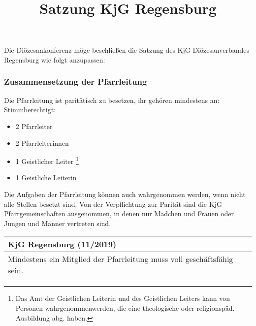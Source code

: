 \documentclass[12pt]{report}
\title{Satzung KjG Regensburg}
\author{}
\newcommand{\footnoteremember}[2]{
  \footnote{#2}
  \newcounter{#1}
  \setcounter{#1}{\value{footnote}}
}
\newcommand{\footnoterecall}[1]{%
  \footnotemark[\value{#1}]
}
\newcounter{tablecounter}
\newcommand\showcounter{\addtocounter{tablecounter}{1}\thetablecounter}
\begin{document}
\begin{flushleft}


Die Diözesankonferenz möge beschließen die Satzung des KjG Diözesanverbandes Regensburg wie folgt anzupassen:


\subsubsection{Zusammensetzung der Pfarrleitung}

Die Pfarrleitung ist paritätisch zu besetzen, ihr gehören mindestens an:
Stimmberechtigt:
\begin{itemize}
  \item 2 Pfarrleiter
  \item 2 Pfarrleiterinnen
  \item 1 Geistlicher Leiter \footnoteremember{Berechtigung Geist}{
    Das Amt der Geistlichen Leiterin und des Geistlichen Leiters kann von Personen wahrgenommenwerden,
    die eine theologische oder religionspäd. Ausbildung abg. haben.
  }
  \item 1 Geistliche Leiterin \footnoterecall{Berechtigung Geist}
\end{itemize}
Die Aufgaben der Pfarrleitung können auch wahrgenommen werden, wenn nicht alle Stellen besetzt sind.
Von der Verpflichtung zur Parität sind die KjG Pfarrgemeinschaften ausgenommen, in
denen nur Mädchen und Frauen oder Jungen und Männer vertreten sind.

\begin{table}[H]
 \begin{tabular}{|l|}
  \hline
  \rowcolor[HTML]{FFCC67} 
  \rule[-1ex]{0pt}{4ex} \textbf{KjG Regensburg (11/2019)}     \hspace{0.6\textwidth} \showcounter        \\ \hline
  \rule[-1ex]{0pt}{4ex} \begin{minipage}[t]{\textwidth} 
   Mindestens ein Mitglied der Pfarrleitung muss voll geschäftsfähig sein.
   \rule[-1.2ex]{0pt}{0pt}
  \end{minipage}
  

\end{tabular}
\end{table}
\end{flushleft}
\end{document}
